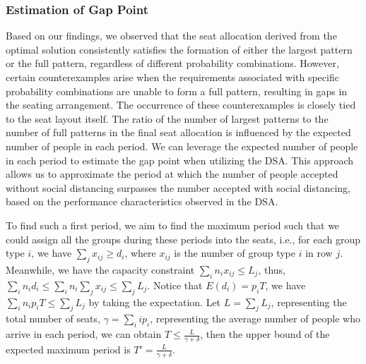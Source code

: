 \subsubsection{Estimation of Gap Point}
Based on our findings, we observed that the seat allocation derived from the optimal solution consistently satisfies the formation of either the largest pattern or the full pattern, regardless of different probability combinations. However, certain counterexamples arise when the requirements associated with specific probability combinations are unable to form a full pattern, resulting in gaps in the seating arrangement. The occurrence of these counterexamples is closely tied to the seat layout itself. The ratio of the number of largest patterns to the number of full patterns in the final seat allocation is influenced by the expected number of people in each period. We can leverage the expected number of people in each period to estimate the gap point when utilizing the DSA. This approach allows us to approximate the period at which the number of people accepted without social distancing surpasses the number accepted with social distancing, based on the performance characteristics observed in the DSA.

To find such a first period, we aim to find the maximum period such that we could assign all the groups during these periods into the seats, i.e., for each group type $i$, we have $\sum_{j} x_{ij} \geq d_i$, where $x_{ij}$ is the number of group type $i$ in row $j$. Meanwhile, we have the capacity constraint $\sum_{i} n_{i} x_{ij} \leq L_j$, thus, $\sum_{i} n_i d_i \leq \sum_{i} n_i \sum_{j} x_{ij} \leq \sum_{j} L_{j}$. Notice that $E(d_i) = p_i T$, we have $\sum_{i} n_i p_i T \leq \sum_{j} L_{j}$ by taking the expectation. Let $L = \sum_{j} L_{j}$, representing the total number of seats, $\gamma = \sum_{i} i p_i$, representing the average number of people who arrive in each period, we can obtain $T \leq \frac{L}{\gamma + \delta}$, then the upper bound of the expected maximum period is $T' = \frac{L}{\gamma + \delta}$.


